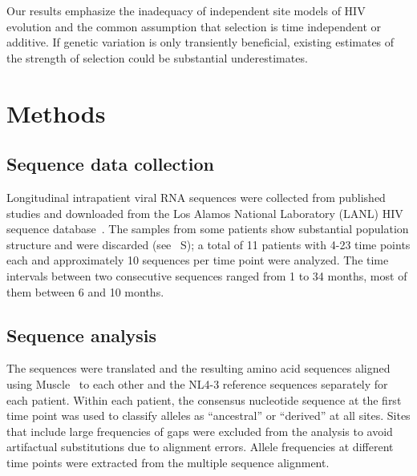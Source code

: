\documentclass[rmp, twocolumn]{revtex4}
\begin{document}
Our results emphasize the inadequacy of independent site models of HIV evolution
and the common assumption that selection is time independent or additive. If
genetic variation is only transiently beneficial, existing estimates of the
strength of selection \citep{neher_recombination_2010,batorsky_estimate_2011}
could be substantial underestimates.

\section{Methods}
\subsection{Sequence data collection}
Longitudinal intrapatient viral RNA sequences were collected from published
studies \citep{shankarappa_consistent_1999, liu_selection_2006,
bunnik_autologous_2008} and downloaded from the Los Alamos National Laboratory
(LANL) HIV sequence database~\citep{LANL2012}. The samples from some patients
show substantial population structure and were discarded (see
\figurename~S\PCApa); a total of 11 patients with 4-23 time points each and
approximately 10 sequences per time point were analyzed. The time intervals
between two consecutive sequences ranged from 1 to 34 months, most of them
between 6 and 10 months.

\subsection{Sequence analysis}
The sequences were translated and the resulting amino acid sequences aligned
using Muscle~\citep{edgar_muscle:_2004} to each other and the NL4-3 reference
sequences separately for each patient. Within each patient, the consensus
nucleotide sequence at the first time point was used to classify alleles as
``ancestral'' or ``derived'' at all sites. Sites that include large
frequencies of gaps were excluded from the analysis to avoid artifactual
substitutions due to alignment errors. Allele frequencies at different time
points were extracted from the multiple sequence alignment.
\end{document}
